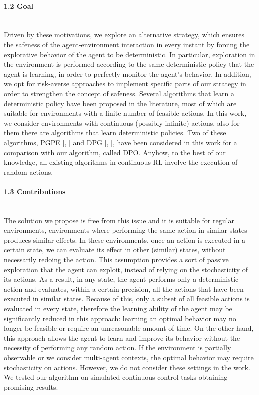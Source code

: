 \paragraph{1.2 Goal} \mbox{} \\
\newline
Driven by these motivations, we explore an alternative strategy, which ensures the safeness of the agent-environment interaction in every instant by forcing the explorative behavior of the agent to be deterministic. In particular, exploration in the environment is performed according to the same deterministic policy that the agent is learning, in order to perfectly monitor the agent's behavior. In addition, we opt for risk-averse approaches to implement specific parts of our strategy in order to strengthen the concept of safeness. Several algorithms that learn a deterministic policy have been proposed in the literature, most of which are suitable for environments with a finite number of feasible actions. In this work, we consider environments with continuous (possibly infinite) actions, also for them there are algorithms that learn deterministic policies. Two of these algorithms, \acf{PGPE} [\citet{sehnke2008policy}, ] and \acf{DPG} [\citet{article}, ], have been considered in this work for a comparison with our algorithm, called \acf{DPO}. Anyhow, to the best of our knowledge, all existing algorithms in continuous \ac{RL} involve the execution of random actions.
\paragraph{1.3 Contributions} \mbox{} \\
\newline
The solution we propose is free from this issue and it is suitable for regular environments, \ie environments where performing the same action in similar states produces similar effects. In these environments, once an action is executed in a certain state, we can evaluate its effect in other (similar) states, without necessarily redoing the action. This assumption provides a sort of passive exploration that the agent can exploit, instead of relying on the stochasticity of its actions. As a result, in any state, the agent performs only a deterministic action and evaluates, within a certain precision, all the actions that have been executed in similar states. Because of this, only a subset of all feasible actions is evaluated in every state, therefore the learning ability of the agent may be significantly reduced in this approach: learning an optimal behavior may no longer be feasible or require an unreasonable amount of time. On the other hand, this approach allows the agent to learn and improve its behavior without the necessity of performing any random action. If the environment is partially observable or we consider multi-agent contexts, the optimal behavior may require stochasticity on actions. However, we do not consider these settings in the work. We tested our algorithm on simulated continuous control tasks obtaining promising results.
